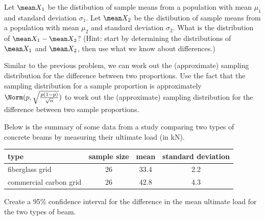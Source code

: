 \documentclass[twoside]{book}\usepackage[]{graphicx}\usepackage[]{xcolor}
\begin{document}
\begin{problem}
Let $\mean X_1$ be the distibution of sample means from a population with mean $\mu_1$ and standard deviation $\sigma_1$.
Let $\mean X_2$ be the distibution of sample means from a population with mean $\mu_2$ and standard deviation $\sigma_2$.
What is the distribution of $\mean X_1 - \mean X_2$? (Hint: start by determining the distributions of 
$\mean X_1$ and $\mean X_2$, then use what we know about differences.)
\end{problem}

\begin{problem}
Similar to the previous problem, we can work out the (approximate) sampling distribution for the difference 
between two proportions. Use the fact that the sampling distribution for a sample proportion is approximately
$\Norm(p, \sqrt{\frac{p(1-p)}{\sqrt{n}}})$ to work out the (approximate) sampling distribution for the 
difference between two sample proportions.
\newpage
\end{problem}

\begin{problem}
Below is the summary of some data from a study 
comparing two types of concrete beams by measuring their ultimate load (in kN).

\begin{center}
\begin{tabular}{lccc}
\hline
type & sample size & mean & standard deviation \\
\hline
fiberglass grid & 26 & 33.4 & 2.2 \\
commercial carbon grid & 26 & 42.8 & 4.3 \\
\hline
\end{tabular}
\end{center}

Create a 95\% confidence interval for the difference in the mean ultimate load for 
the two types of beam.
\end{problem}
\end{document}
